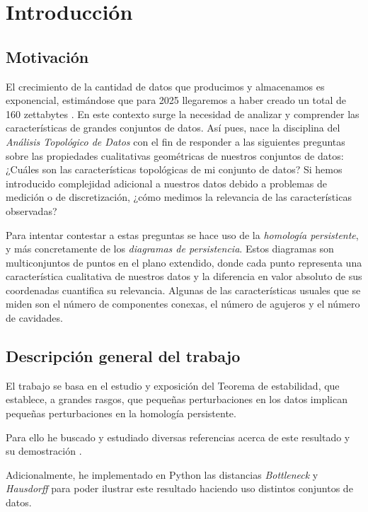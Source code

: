 \chapter{Introducción}

\section{Motivación}
El crecimiento de la cantidad de datos que producimos y almacenamos es exponencial, estimándose que para 2025 llegaremos a haber creado un total de 160 zettabytes \cite{datos2025}. En este contexto surge la necesidad de analizar y comprender las características de grandes conjuntos de datos. Así pues, nace la disciplina del \emph{Análisis Topológico de Datos} con el fin de responder a las siguientes preguntas sobre las propiedades cualitativas geométricas de nuestros conjuntos de datos: ¿Cuáles son las características topológicas de mi conjunto de datos? Si hemos introducido complejidad adicional a nuestros datos debido a problemas de medición o de discretización, ¿cómo medimos la relevancia de las características observadas?

Para intentar contestar a estas preguntas se hace uso de la \emph{homología persistente}, y más concretamente de los \emph{diagramas de persistencia}. Estos diagramas son multiconjuntos de puntos en el plano extendido, donde cada punto representa una característica cualitativa de nuestros datos y la diferencia en valor absoluto de sus coordenadas cuantifica su relevancia. Algunas de las características usuales que se miden son el número de componentes conexas, el número de agujeros y el número de cavidades.

\section{Descripción general del trabajo}
El trabajo se basa en el estudio y exposición del Teorema de estabilidad, que establece, a grandes rasgos, que pequeñas perturbaciones en los datos implican pequeñas perturbaciones en la homología persistente.

Para ello he buscado y estudiado diversas referencias acerca de este resultado y su demostración \cite{libroEH, articuloPersistenciaEH, Cohen-Steiner2007}.

Adicionalmente, he implementado en Python las distancias \emph{Bottleneck} y \emph{Hausdorff} para poder ilustrar este resultado haciendo uso distintos conjuntos de datos. 

